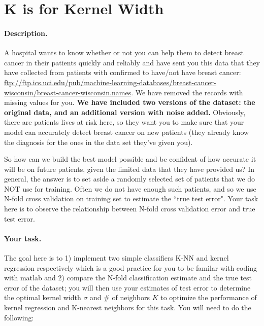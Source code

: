 \section{K is for Kernel Width }

\paragraph{Description.} A hospital wants to know whether or not you can help them to detect
breast cancer in their patients quickly and reliably and have sent you
this data that they have collected from patients with confirmed to
have/not have breast cancer: \url{ftp://ftp.ics.uci.edu/pub/machine-learning-databases/breast-cancer-wisconsin/breast-cancer-wisconsin.names}. We
have removed the records with missing values for you. {\bf We have
  included two versions of the dataset: the original data, and an
  additional version with noise added.} Obviously, there are
patients lives at risk here, so they want you to make sure that your
model can accurately detect breast cancer on new patients
(they already know the diagnosis for the ones in the data set they've given you).

So how can we build the best model possible and be confident of how accurate it will be on future patients, given the limited data that they have provided us? In general, the answer is to set aside a randomly selected set of patients that we do NOT use for training. Often we do not have enough such patients, and so we use N-fold cross validation on training set to estimate the ``true test error". Your task here is to observe the relationship between N-fold cross validation error and true test error.

\paragraph{Your task.}
The goal here is to 1) implement two simple classifiers K-NN and kernel regression respectively which is a good practice for you to be familar with coding with matlab and 2) compare the N-fold classification estimate and the true test error of the dataset; 
you will then use your estimates of test error to determine the optimal kernel width $\sigma$ and \# of neighbors $K$ to optimize the performance of kernel regression and K-nearest neighbors for this task. 
You will need to do the following:

